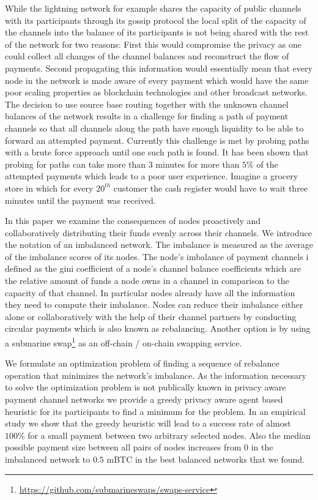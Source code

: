 \documentclass[a4paper]{paper}
\begin{document}
While the lightning network for example shares the capacity of public channels with its participants through its gossip protocol the local split of the capacity of the channels into the balance of its participants is not being shared with the rest of the network for two reasons:
First this would compromise the privacy as one could collect all changes of the channel balances and reconstruct the flow of payments.
Second propagating this information would essentially mean that every node in the network is made aware of every payment which would have the same poor scaling properties as blockchain technologies and other broadcast networks.
The decision to use source base routing together with the unknown channel balances of the network results in a challenge for finding a path of payment channels so that all channels along the path have enough liquidity to be able to forward an attempted payment.
Currently this challenge is met by probing paths with a brute force approach until one such path is found.
It has been shown that probing for paths can take more than 3 minutes for more than $5\%$ of the attempted payments \cite{decker2019lnconf} which leads to a poor user experience.
Imagine a grocery store in which for every $20^{th}$ customer the cash register would have to wait three minutes until the payment was received.

In this paper we examine the consequences of nodes proactively and collaboratively distributing their funds evenly across their channels.
We introduce the notation of an imbalanced network.
The imbalance is measured as the average of the imbalance scores of its nodes.
The node's imbalance of payment channels i defined as the gini coefficient of a node's channel balance coefficients which are the relative amount of funds a node owns in a channel in comparison to the capacity of that channel.
In particular nodes already have all the information they need to compute their imbalance. 
Nodes can reduce their imbalance either alone or collaboratively with the help of their channel partners by conducting circular payments which is also known as rebalancing.
Another option is by using a submarine swap\footnote{\url{https://github.com/submarineswaps/swaps-service}} as an off-chain / on-chain swapping service.

We formulate an optimization problem of finding a sequence of rebalance operation that minimizes the network's imbalance.
As the information necessary to solve the optimization problem is not publically known in privacy aware payment channel networks we provide a greedy privacy aware agent based heuristic for its participants to find a minimum for the problem. 
In an empirical study we show that the greedy heuristic will lead to a success rate of almost $100\%$ for a small payment between two arbitrary selected nodes.
Also the median possible payment size between all pairs of nodes increases from $0$ in the imbalanced network to $0.5$ mBTC in the best balanced networks that we found.
\end{document}
